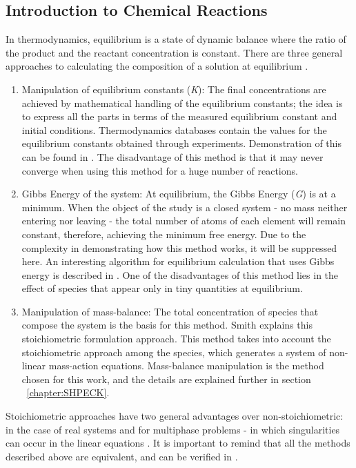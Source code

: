 \subsection{Introduction to Chemical Reactions}
In thermodynamics, equilibrium is a state of dynamic balance where the ratio of the product and the reactant concentration is constant. There are three general approaches to calculating the composition of a solution at equilibrium \cite{Petrucci:07}.
\begin{enumerate}
    \item Manipulation of equilibrium constants (\emph{K}): The final concentrations are achieved by mathematical handling of the equilibrium constants; the idea is to express all the parts in terms of the measured equilibrium constant and initial conditions. Thermodynamics databases contain the values for the equilibrium constants obtained through experiments. Demonstration of this can be found in \cite{Kehew:00}. The disadvantage of this method is that it may never converge when using this method for a huge number of reactions.
    \item Gibbs Energy of the system: At equilibrium, the Gibbs Energy (\emph{G}) is at a minimum. When the object of the study is a closed system - no mass neither entering nor leaving - the total number of atoms of each element will remain constant, therefore, achieving the minimum free energy. Due to the complexity in demonstrating how this method works, it will be suppressed here. An interesting algorithm for equilibrium calculation that uses Gibbs energy is described in \cite{Allan:15}. One of the disadvantages of this method lies in the effect of species that appear only in tiny quantities at equilibrium.
    \item Manipulation of mass-balance: The total concentration of species that compose the system is the basis for this method. Smith \cite{Smith:80} explains this stoichiometric formulation approach. This method takes into account the stoichiometric approach among the species, which generates a system of non-linear mass-action equations. Mass-balance manipulation is the method chosen for this work, and the details are explained further in section ~\ref{chapter:SHPECK}.
\end{enumerate}

Stoichiometric approaches have two general advantages over non-stoichiometric: in the case of real systems and for multiphase problems - in which singularities can occur in the linear equations \cite{Smith:80}. It is important to remind that all the methods described above are equivalent, and can be verified in \cite{Zeggeren:70}.


